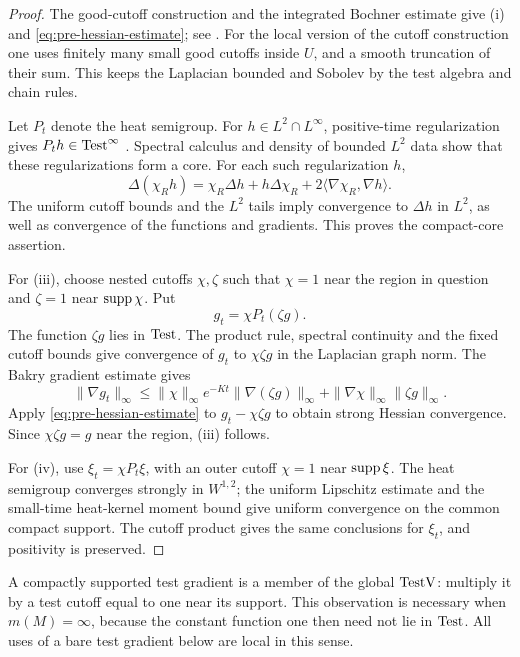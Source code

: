 \begin{proof}
The good-cutoff construction and the integrated Bochner estimate give
\textup{(i)} and \eqref{eq:pre-hessian-estimate}; see
\cite[Appendix~A, Lemma~A.2 and Equation~(A.13)]{GigliTamanini2021}.
For the local version of the cutoff construction one uses finitely
many small good cutoffs inside \(U\), and a smooth truncation of their
sum. This keeps the Laplacian bounded and Sobolev by the test
algebra and chain rules.

Let \(P_t\) denote the heat semigroup. For \(h\in L^2\cap L^\infty\),
positive-time regularization gives
\(P_th\in\operatorname{Test}^\infty\)
\cite[Appendix~A, Equation~(A.7)]{GigliTamanini2021}.
Spectral calculus and density of bounded \(L^2\) data show that these
regularizations form a core. For each such regularization \(h\),
\[
\Delta(\chi_Rh)
=\chi_R\Delta h+h\Delta\chi_R
+2\langle\nabla\chi_R,\nabla h\rangle.
\]
The uniform cutoff bounds and the \(L^2\) tails imply convergence
to \(\Delta h\) in \(L^2\), as well as convergence of the functions
and gradients. This proves the compact-core assertion.

For \textup{(iii)}, choose nested cutoffs \(\chi,\zeta\) such that
\(\chi=1\) near the region in question and \(\zeta=1\) near
\(\operatorname{supp}\chi\). Put
\[
g_t=\chi P_t(\zeta g).
\]
The function \(\zeta g\) lies in \(\operatorname{Test}\). The product rule,
spectral continuity and the fixed cutoff bounds give convergence
of \(g_t\) to \(\chi\zeta g\) in the Laplacian graph norm.
The Bakry gradient estimate gives
\[
\|\nabla g_t\|_\infty
\le \|\chi\|_\infty e^{-Kt}\|\nabla(\zeta g)\|_\infty
+\|\nabla\chi\|_\infty\|\zeta g\|_\infty.
\]
Apply \eqref{eq:pre-hessian-estimate} to
\(g_t-\chi\zeta g\) to obtain strong Hessian convergence.
Since \(\chi\zeta g=g\) near the region, \textup{(iii)} follows.

For \textup{(iv)}, use \(\xi_t=\chi P_t\xi\), with an outer
cutoff \(\chi=1\) near \(\operatorname{supp}\xi\).
The heat semigroup converges strongly in \(W^{1,2}\);
the uniform Lipschitz estimate and the small-time heat-kernel
moment bound give uniform convergence on the common compact
support. The cutoff product gives the same conclusions for
\(\xi_t\), and positivity is preserved.
\end{proof}

\begin{remark}
\label{pre:bare-gradients}
A compactly supported test gradient is a member of the global
\(\operatorname{TestV}\): multiply it by a test cutoff equal to one near its
support. This observation is necessary when \(m(M)=\infty\),
because the constant function one then need not lie in \(\operatorname{Test}\).
All uses of a bare test gradient below are local in this sense.
\end{remark}


